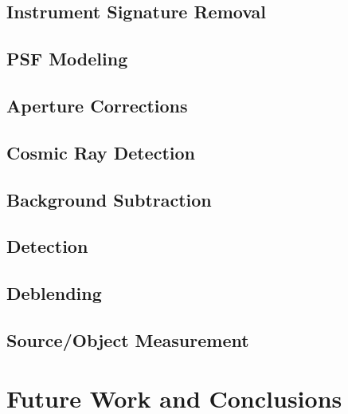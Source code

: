 \subsection{Instrument Signature Removal}

\subsection{PSF Modeling}

\subsection{Aperture Corrections}

\subsection{Cosmic Ray Detection}

\subsection{Background Subtraction}

\subsection{Detection}

\subsection{Deblending}

\subsection{Source/Object Measurement}


\section{Future Work and Conclusions}

